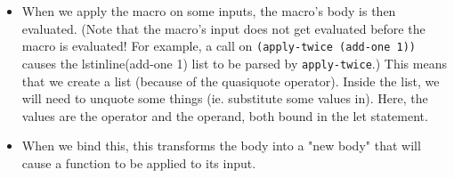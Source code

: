 \begin{blocksection}
\begin{solution}
\begin{itemize}
  \item When we apply the macro on some inputs, the macro’s body is then evaluated. 
  (Note that the macro’s input does not get evaluated before the macro is evaluated! 
  For example, a call on \lstinline{(apply-twice (add-one 1))} causes the lstinline{(add-one 1)} list to be 
  parsed by \lstinline{apply-twice}.) This means that we create a list (because of the quasiquote 
  operator). Inside the list, we will need to unquote some things (ie. substitute some 
  values in). Here, the values are the operator and the operand, both bound in the let 
  statement.
  \item When we bind this, this transforms the body into a "new body" that will cause a 
  function to be applied to its input.
\end{itemize}
\end{solution}

\end{blocksection}